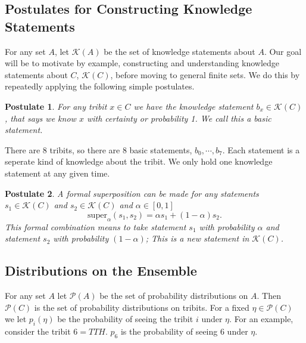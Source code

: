 \documentclass[12pt,a4paper]{article}
\theoremstyle{myrule}
\theoremstyle{postulate}
\newtheorem{postulate}{Postulate}[section]
\theoremstyle{definition}
\begin{document}
\subsection{Postulates for Constructing Knowledge Statements}
For any set $A$, let $\mathcal{K}(A)$ be the set of knowledge statements about $A$.  Our goal will be to motivate by example, constructing and understanding knowledge statements about $C$, $\mathcal{K}(C)$, before moving to general finite sets.  We do this by repeatedly applying the following simple postulates.
\begin{postulate}
\label{rule1}
For any tribit $x \in C$ we have the knowledge statement $b_x \in \mathcal{K}(C)$, that says we know $x$ with certainty or probability 1.  We call this a basic statement.
\end{postulate}
There are 8 tribits, so there are 8 basic statements, $b_\mathit{0},\cdots,b_\mathit{7}$.  Each statement is a seperate kind of knowledge about the tribit.  We only hold one knowledge statement at any given time.
\begin{postulate}
 \label{rule2}
  A formal superposition can be made for any statements $s_1 \in \mathcal{K}(C)$ and $s_2 \in \mathcal{K}(C)$ and $\alpha \in [0,1]$
  \begin{equation}
  \label{super}
  \text{super}_\alpha(s_1,s_2) = \alpha s_1 + (1 -\alpha) s_2.
  \end{equation}
This formal combination means to take statement $s_1$ with probability $\alpha$ and statement $s_2$ with probability $(1-\alpha)$; This is a new statement in $ \mathcal{K}(C)$.
\end{postulate}

\subsection{Distributions on the Ensemble}

For any set $A$ let $\mathcal{P}(A)$ be the set of probability distributions on $A$.  Then $\mathcal{P}(C)$ is the set of probability distributions on tribits. For a fixed $\eta \in \mathcal{P}(C)$ we let $p_i(\eta)$ be the probability of seeing the tribit $i$ under $\eta$.  For an example, consider the tribit $\mathit{6} = TTH$.  $p_\mathit{6}$ is the probability of seeing $\mathit{6}$ under $\eta$.
\end{document}
